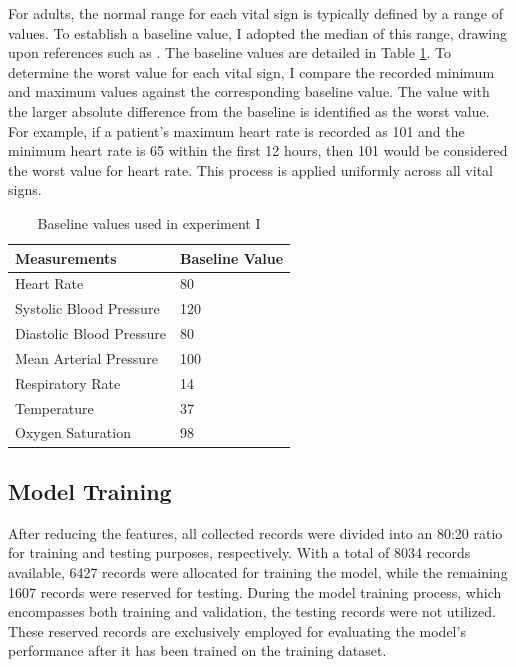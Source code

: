\documentclass[12pt,a4paper,english
]{tunithesis}
\begin{document}
For adults, the normal range for each vital sign is typically defined by a range of values. To establish a baseline value, I adopted the median of this range, drawing upon references such as \textcite{medlineplus, johnsh, torp2023, yalemed}. The baseline values are detailed in Table \ref{table:baseline_value}. To determine the worst value for each vital sign, I compare the recorded minimum and maximum values against the corresponding baseline value. The value with the larger absolute difference from the baseline is identified as the worst value. For example, if a patient's maximum heart rate is recorded as 101 and the minimum heart rate is 65 within the first 12 hours, then 101 would be considered the worst value for heart rate. This process is applied uniformly across all vital signs.
 
\begin{table}[ht]
\centering
    \caption{Baseline values used in experiment I}
    \label{table:baseline_value}
    \begin{tabular}{|l|l|}
        \hline
        \textbf{Measurements} & \textbf{Baseline Value}\\ \hline
            Heart Rate& 80                \\ \hline
            Systolic Blood Pressure& 120               \\ \hline
            Diastolic Blood Pressure& 80                \\ \hline
            Mean Arterial Pressure& 100               \\ \hline
            Respiratory Rate& 14\\ \hline
            Temperature& 37\\ \hline
            Oxygen Saturation& 98                \\\hline
    \end{tabular}
\end{table}

\subsection{Model Training}

After reducing the features, all collected records were divided into an 80:20 ratio for training and testing purposes, respectively. With a total of 8034 records available, 6427 records were allocated for training the model, while the remaining 1607 records were reserved for testing. During the model training process, which encompasses both training and validation, the testing records were not utilized. These reserved records are exclusively employed for evaluating the model's performance after it has been trained on the training dataset. 
\end{document}

